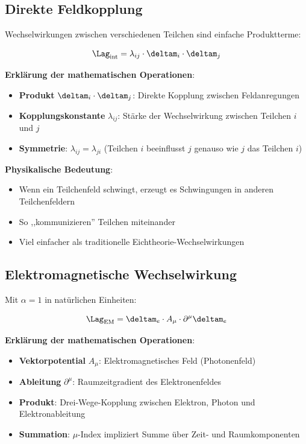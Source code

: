 	\subsection{Direkte Feldkopplung}
	
	Wechselwirkungen zwischen verschiedenen Teilchen sind einfache Produktterme:
	
	\begin{equation}
		\Lag_{\text{int}} = \lambda_{ij} \cdot \deltam_i \cdot \deltam_j
		\label{eq:interaction_lagrangian}
	\end{equation}
	
	\textbf{Erklärung der mathematischen Operationen}:
	\begin{itemize}
		\item \textbf{Produkt} $\deltam_i \cdot \deltam_j$: Direkte Kopplung zwischen Feldanregungen
		\item \textbf{Kopplungskonstante} $\lambda_{ij}$: Stärke der Wechselwirkung zwischen Teilchen $i$ und $j$
		\item \textbf{Symmetrie}: $\lambda_{ij} = \lambda_{ji}$ (Teilchen $i$ beeinflusst $j$ genauso wie $j$ das Teilchen $i$)
	\end{itemize}
	
	\textbf{Physikalische Bedeutung}:
	\begin{itemize}
		\item Wenn ein Teilchenfeld schwingt, erzeugt es Schwingungen in anderen Teilchenfeldern
		\item So ,,kommunizieren'' Teilchen miteinander
		\item Viel einfacher als traditionelle Eichtheorie-Wechselwirkungen
	\end{itemize}
	
	\subsection{Elektromagnetische Wechselwirkung}
	
	Mit $\alpha = 1$ in natürlichen Einheiten:
	
	\begin{equation}
		\Lag_{\text{EM}} = \deltam_e \cdot A_\mu \cdot \partial^\mu \deltam_e
		\label{eq:em_interaction}
	\end{equation}
	
	\textbf{Erklärung der mathematischen Operationen}:
	\begin{itemize}
		\item \textbf{Vektorpotential} $A_\mu$: Elektromagnetisches Feld (Photonenfeld)
		\item \textbf{Ableitung} $\partial^\mu$: Raumzeitgradient des Elektronenfeldes
		\item \textbf{Produkt}: Drei-Wege-Kopplung zwischen Elektron, Photon und Elektronableitung
		\item \textbf{Summation}: $\mu$-Index impliziert Summe über Zeit- und Raumkomponenten
	\end{itemize}
	
